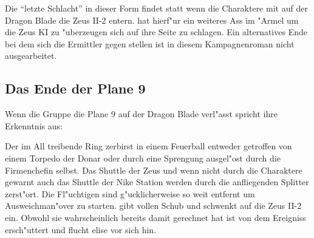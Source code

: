 




































Die "`letzte Schlacht"' in dieser Form findet statt wenn die Charaktere mit \xl{} auf der Dragon Blade die Zeus II-2 entern. \xl{} hat hierf"ur ein weiteres Ass im "Armel um die Zeus KI zu "uberzeugen sich auf ihre Seite zu schlagen. Ein alternatives Ende bei dem sich die Ermittler gegen \xl{} stellen ist in diesem Kampagnenroman nicht ausgearbeitet.

\subsection{Das Ende der Plane 9}
Wenn die Gruppe die Plane 9 auf der Dragon Blade verl"asst spricht \xl{} ihre Erkenntnis aus:


Der im All treibende Ring zerbirst in einem Feuerball entweder getroffen von einem Torpedo der Donar oder durch eine Sprengung ausgel"ost durch die Firmenchefin selbst. Das Shuttle der Zeus und wenn nicht durch die Charaktere gewarnt auch das Shuttle der Nike Station werden durch die anfliegenden Splitter zerst"ort. Die Fl"uchtigen sind g"ucklicherweise so weit entfernt um Ausweichman"over zu starten. \xl{} gibt vollen Schub und schwenkt auf die Zeus II-2 ein. Obwohl sie wahrscheinlich bereits damit gerechnet hat ist \ml{} von dem Ereigniss ersch"uttert und flucht elise vor sich hin.

